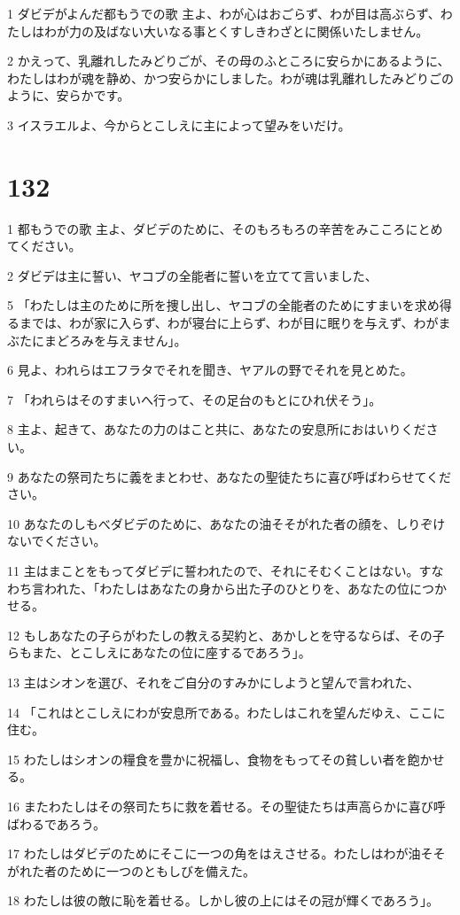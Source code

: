 \par 1 ダビデがよんだ都もうでの歌 主よ、わが心はおごらず、わが目は高ぶらず、わたしはわが力の及ばない大いなる事とくすしきわざとに関係いたしません。
\par 2 かえって、乳離れしたみどりごが、その母のふところに安らかにあるように、わたしはわが魂を静め、かつ安らかにしました。わが魂は乳離れしたみどりごのように、安らかです。
\par 3 イスラエルよ、今からとこしえに主によって望みをいだけ。

\chapter{132}

\par 1 都もうでの歌 主よ、ダビデのために、そのもろもろの辛苦をみこころにとめてください。
\par 2 ダビデは主に誓い、ヤコブの全能者に誓いを立てて言いました、
\par 5 「わたしは主のために所を捜し出し、ヤコブの全能者のためにすまいを求め得るまでは、わが家に入らず、わが寝台に上らず、わが目に眠りを与えず、わがまぶたにまどろみを与えません」。
\par 6 見よ、われらはエフラタでそれを聞き、ヤアルの野でそれを見とめた。
\par 7 「われらはそのすまいへ行って、その足台のもとにひれ伏そう」。
\par 8 主よ、起きて、あなたの力のはこと共に、あなたの安息所におはいりください。
\par 9 あなたの祭司たちに義をまとわせ、あなたの聖徒たちに喜び呼ばわらせてください。
\par 10 あなたのしもべダビデのために、あなたの油そそがれた者の顔を、しりぞけないでください。
\par 11 主はまことをもってダビデに誓われたので、それにそむくことはない。すなわち言われた、「わたしはあなたの身から出た子のひとりを、あなたの位につかせる。
\par 12 もしあなたの子らがわたしの教える契約と、あかしとを守るならば、その子らもまた、とこしえにあなたの位に座するであろう」。
\par 13 主はシオンを選び、それをご自分のすみかにしようと望んで言われた、
\par 14 「これはとこしえにわが安息所である。わたしはこれを望んだゆえ、ここに住む。
\par 15 わたしはシオンの糧食を豊かに祝福し、食物をもってその貧しい者を飽かせる。
\par 16 またわたしはその祭司たちに救を着せる。その聖徒たちは声高らかに喜び呼ばわるであろう。
\par 17 わたしはダビデのためにそこに一つの角をはえさせる。わたしはわが油そそがれた者のために一つのともしびを備えた。
\par 18 わたしは彼の敵に恥を着せる。しかし彼の上にはその冠が輝くであろう」。

